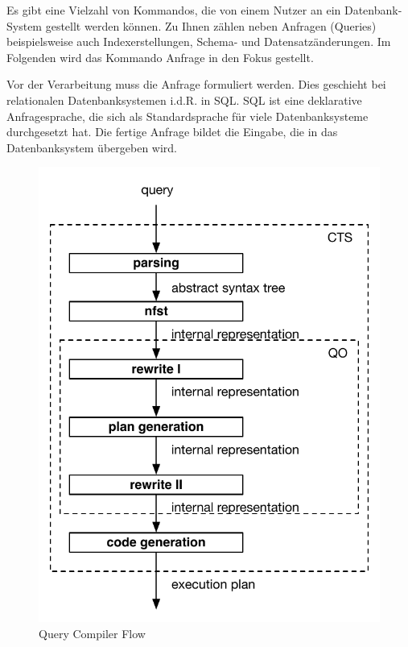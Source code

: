 Es gibt eine Vielzahl von Kommandos, die von einem Nutzer an ein Datenbank-System gestellt werden können. Zu Ihnen zählen neben Anfragen (Queries) beispielsweise auch Indexerstellungen, Schema- und Datensatzänderungen. Im Folgenden wird das Kommando Anfrage in den Fokus gestellt.

Vor der Verarbeitung muss die Anfrage formuliert werden. Dies geschieht bei relationalen Datenbanksystemen i.d.R. in \ac{SQL}. \ac{SQL} ist eine deklarative Anfragesprache, die sich als Standardsprache für viele Datenbanksysteme durchgesetzt hat. Die fertige Anfrage bildet die Eingabe, die in das Datenbanksystem übergeben wird. 


\begin{figure}[ht]
  \centering
  \includegraphics{02_Related_Work/QCArchitecture.pdf}
  \caption{Query Compiler Flow}
  \label{DBMS_Interpreter}
\end{figure}


